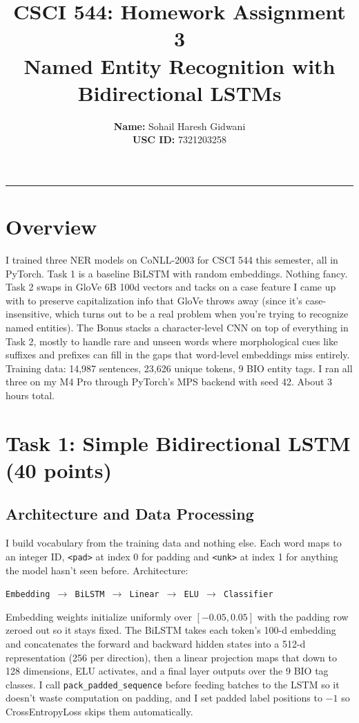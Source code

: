 \documentclass[11pt]{article}
\title{\textbf{CSCI 544: Homework Assignment 3}\\[0.5em]
\large Named Entity Recognition with Bidirectional LSTMs}
\author{
\textbf{Name:} Sohail Haresh Gidwani \\
\textbf{USC ID:} 7321203258
}
\date{}
\begin{document}
\maketitle
\hrule
\vspace{1.5em}

\section{Overview}

I trained three NER models on CoNLL-2003 for CSCI 544 this semester, all in PyTorch. Task 1 is a baseline BiLSTM with random embeddings. Nothing fancy. Task 2 swaps in GloVe 6B 100d vectors and tacks on a case feature I came up with to preserve capitalization info that GloVe throws away (since it's case-insensitive, which turns out to be a real problem when you're trying to recognize named entities). The Bonus stacks a character-level CNN on top of everything in Task 2, mostly to handle rare and unseen words where morphological cues like suffixes and prefixes can fill in the gaps that word-level embeddings miss entirely. Training data: 14,987 sentences, 23,626 unique tokens, 9 BIO entity tags. I ran all three on my M4 Pro through PyTorch's MPS backend with seed 42. About 3 hours total.

\section{Task 1: Simple Bidirectional LSTM (40 points)}

\subsection{Architecture and Data Processing}

I build vocabulary from the training data and nothing else. Each word maps to an integer ID, \texttt{<pad>} at index 0 for padding and \texttt{<unk>} at index 1 for anything the model hasn't seen before. Architecture:

\begin{center}
\texttt{Embedding $\rightarrow$ BiLSTM $\rightarrow$ Linear $\rightarrow$ ELU $\rightarrow$ Classifier}
\end{center}

Embedding weights initialize uniformly over $[-0.05, 0.05]$ with the padding row zeroed out so it stays fixed. The BiLSTM takes each token's 100-d embedding and concatenates the forward and backward hidden states into a 512-d representation (256 per direction), then a linear projection maps that down to 128 dimensions, ELU activates, and a final layer outputs over the 9 BIO tag classes. I call \texttt{pack\_padded\_sequence} before feeding batches to the LSTM so it doesn't waste computation on padding, and I set padded label positions to $-1$ so CrossEntropyLoss skips them automatically.
\end{document}
